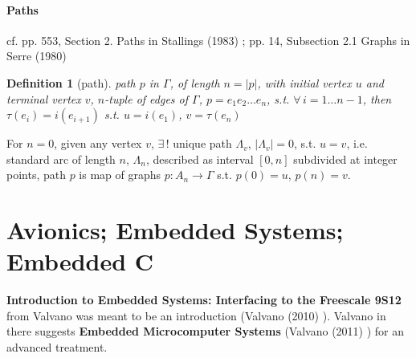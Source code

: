 \documentclass[10pt]{amsart}
\newtheorem{definition}{Definition}
\begin{document}
\begin{multicols*}{2}
\subsection{Paths}

cf. pp. 553, Section 2. Paths in Stallings (1983) \cite{Stal1983}; pp. 14, Subsection 2.1 Graphs in Serre (1980) \cite{Serr1980}
\begin{definition}[path]
path $p$ in $\Gamma$, of length $n=|p|$, with initial vertex $u$ and terminal vertex $v$, $n$-tuple of edges of $\Gamma$, $p=e_1 e_2 \dots e_n$, s.t. $\forall \, i = 1\dots n-1$, then $\tau(e_i) = i(e_{i+1})$ s.t. $u=i(e_1)$, $v=\tau(e_n)$  

\end{definition}

For $n=0$, given any vertex $v$, $\exists \, !$ unique path $\Lambda_v$, $| \Lambda_v| =0$, s.t. $u=v$, i.e. \\
standard arc of length $n$, $\Lambda_n$, described as interval $[0,n]$ subdivided at integer points, path $p$ is map of graphs $p:A_n \to \Gamma$ s.t. $p(0)=u$, $p(n)=v$.  


\part{Avionics; Embedded Systems; Embedded C}  

\textbf{Introduction to Embedded Systems: Interfacing to the Freescale 9S12} from Valvano was meant to be an introduction (Valvano (2010) \cite{Valv2010}).  Valvano in there suggests \textbf{Embedded Microcomputer Systems} (Valvano (2011) \cite{Valv2011}) for an advanced treatment.  





\end{multicols*}
\end{document}
